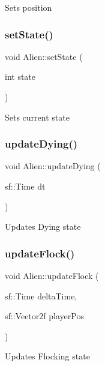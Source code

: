 Sets position \mbox{\label{class_alien_aead215fe05108897f31e12c9e58b0d90}} 
\subsubsection{\texorpdfstring{set\+State()}{setState()}}
{\footnotesize\ttfamily void Alien\+::set\+State (\begin{DoxyParamCaption}\item[{int}]{state }\end{DoxyParamCaption})}

Sets current state \mbox{\label{class_alien_aa85a70c1e7ed8d7d728df94ad47b83a2}} 
\subsubsection{\texorpdfstring{update\+Dying()}{updateDying()}}
{\footnotesize\ttfamily void Alien\+::update\+Dying (\begin{DoxyParamCaption}\item[{sf\+::\+Time}]{dt }\end{DoxyParamCaption})}

Updates Dying state \mbox{\label{class_alien_a831772470c94eed62a50c173b002c513}} 
\subsubsection{\texorpdfstring{update\+Flock()}{updateFlock()}}
{\footnotesize\ttfamily void Alien\+::update\+Flock (\begin{DoxyParamCaption}\item[{sf\+::\+Time}]{delta\+Time,  }\item[{sf\+::\+Vector2f}]{player\+Pos }\end{DoxyParamCaption})}

Updates Flocking state \mbox{\label{class_alien_a6081c8a068679e203e6e920b9197e4de}} 
